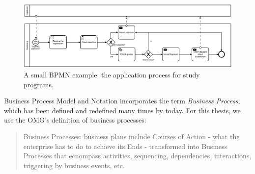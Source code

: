 \begin{figure}

	\centering
	\includegraphics[scale=0.5]{../figures/chapter_indicators/BPMN_Example_Student_Application.png} 
		\caption{A small BPMN example: the application process for study programs.}
	\label{fig:BPMNex}
\end{figure}

Business Process Model and Notation incorporates the term \textit{Business Process}, which has been defined and redefined many times by today. For this thesis, we use the OMG's definition of business processes: 

\begin{quote}
Business Processes: business plans include Courses of Action - what the enterprise has to do to achieve its Ends - transformed into Business Processes that ecnompass activities, sequencing, dependencies, interactions, triggering by business events, etc. \cite{bmm2015}
\end{quote}

